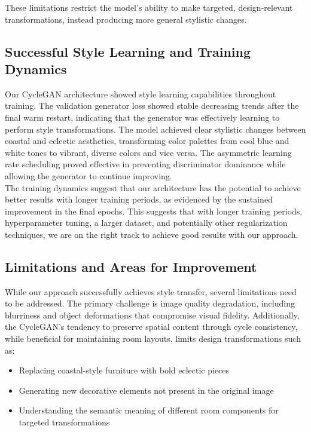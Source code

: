 \documentclass[twocolumn,superscriptaddress,aps]{revtex4-1}
\begin{document}
These limitations restrict the model's ability to make targeted, design-relevant transformations, instead producing more general stylistic changes.

\subsection{Successful Style Learning and Training Dynamics}

Our CycleGAN architecture showed style learning capabilities throughout training. The validation generator loss showed stable decreasing trends after the final warm restart, indicating that the generator was effectively learning to perform style transformations. The model achieved clear stylistic changes between coastal and eclectic aesthetics, transforming color palettes from cool blue and white tones to vibrant, diverse colors and vice versa. The asymmetric learning rate scheduling proved effective in preventing discriminator dominance while allowing the generator to continue improving. \\

The training dynamics suggest that our architecture has the potential to achieve better results with longer training periods, as evidenced by the sustained improvement in the final epochs. This suggests that with longer training periods, hyperparameter tuning, a larger dataset, and potentially other regularization techniques, we are on the right track to achieve good results with our approach.

\subsection{Limitations and Areas for Improvement}

While our approach successfully achieves style transfer, several limitations need to be addressed. The primary challenge is image quality degradation, including blurriness and object deformations that compromise visual fidelity. Additionally, the CycleGAN's tendency to preserve spatial content through cycle consistency, while beneficial for maintaining room layouts, limits design transformations such as:

\begin{itemize}
    \item Replacing coastal-style furniture with bold eclectic pieces
    \item Generating new decorative elements not present in the original image
    \item Understanding the semantic meaning of different room components for targeted transformations
\end{itemize}
\end{document}
